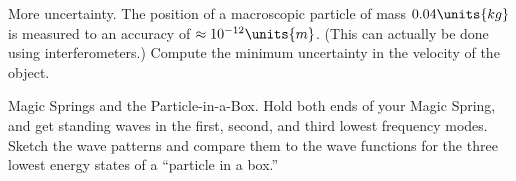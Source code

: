 \begin{aproblem}{More uncertainty.}  
  The position of a macroscopic particle of mass $0.04\units{kg}$ is
  measured to an accuracy of $\approx 10^{-12}\units{m}$.  (This can
  actually be done using interferometers.)  Compute the minimum
  uncertainty in the velocity of the object.
  \label{prob:moreuncertainty} 
\end{aproblem}

\newpage

\begin{aproblem}{Magic Springs and the Particle-in-a-Box.}  
  Hold both ends of your Magic Spring, and get standing waves in the
  first, second, and third lowest frequency modes.  Sketch the wave
  patterns and compare them to the wave functions for the three lowest
  energy states of a ``particle in a box.''
\end{aproblem}

